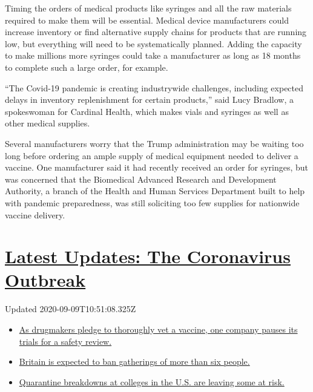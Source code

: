Timing the orders of medical products like syringes and all the raw
materials required to make them will be essential. Medical device
manufacturers could increase inventory or find alternative supply chains
for products that are running low, but everything will need to be
systematically planned. Adding the capacity to make millions more
syringes could take a manufacturer as long as 18 months to complete such
a large order, for example.

``The Covid-19 pandemic is creating industrywide challenges, including
expected delays in inventory replenishment for certain products,'' said
Lucy Bradlow, a spokeswoman for Cardinal Health, which makes vials and
syringes as well as other medical supplies.

Several manufacturers worry that the Trump administration may be waiting
too long before ordering an ample supply of medical equipment needed to
deliver a vaccine. One manufacturer said it had recently received an
order for syringes, but was concerned that the Biomedical Advanced
Research and Development Authority, a branch of the Health and Human
Services Department built to help with pandemic preparedness, was still
soliciting too few supplies for nationwide vaccine delivery.

\hypertarget{latest-updates-the-coronavirus-outbreak}{%
\section{\texorpdfstring{\href{https://www.nytimes3xbfgragh.onion/2020/09/09/world/covid-19-coronavirus.html?action=click\&pgtype=Article\&state=default\&region=MAIN_CONTENT_1\&context=storylines_live_updates}{Latest
Updates: The Coronavirus
Outbreak}}{Latest Updates: The Coronavirus Outbreak}}\label{latest-updates-the-coronavirus-outbreak}}

Updated 2020-09-09T10:51:08.325Z

\begin{itemize}
\tightlist
\item
  \href{https://www.nytimes3xbfgragh.onion/2020/09/09/world/covid-19-coronavirus.html?action=click\&pgtype=Article\&state=default\&region=MAIN_CONTENT_1\&context=storylines_live_updates\#link-70cea8bb}{As
  drugmakers pledge to thoroughly vet a vaccine, one company pauses its
  trials for a safety review.}
\item
  \href{https://www.nytimes3xbfgragh.onion/2020/09/09/world/covid-19-coronavirus.html?action=click\&pgtype=Article\&state=default\&region=MAIN_CONTENT_1\&context=storylines_live_updates\#link-780eaa2f}{Britain
  is expected to ban gatherings of more than six people.}
\item
  \href{https://www.nytimes3xbfgragh.onion/2020/09/09/world/covid-19-coronavirus.html?action=click\&pgtype=Article\&state=default\&region=MAIN_CONTENT_1\&context=storylines_live_updates\#link-11cec4c0}{Quarantine
  breakdowns at colleges in the U.S. are leaving some at risk.}
\end{itemize}

